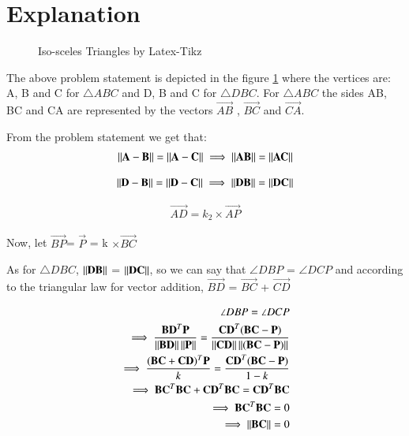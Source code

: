 \documentclass[journal,12pt,twocolumn]{IEEEtran}
\begin{document}
\section{Explanation}
\begin{figure}[!ht]
\centering
\resizebox{\columnwidth}{!}{}
\caption{Iso-sceles Triangles by Latex-Tikz}
\label{fig:iso_scelen}	
\end{figure}

The above problem statement is depicted in the figure \ref{fig:iso_scelen} where the vertices are: A, B and C for $\triangle ABC$ and D, B and C for $\triangle DBC$. For $\triangle ABC$ the sides AB, BC and CA are represented by the vectors $\vec{AB}$ , $\vec{BC}$ and $\vec{CA}$.

From the problem statement we get that:
\begin{align}
\left\lVert\mathbf{A}-\mathbf{B}\right\rVert = \left\lVert\mathbf{A}-\mathbf{C}\right\rVert
\implies \left\lVert\mathbf{AB}\right\rVert = \left\lVert\mathbf{AC}\right\rVert
\end{align}
\label{cond1}

\begin{align}
\left\lVert\mathbf{D}-\mathbf{B}\right\rVert = \left\lVert\mathbf{D}-\mathbf{C}\right\rVert
\implies \left\lVert\mathbf{DB}\right\rVert = \left\lVert\mathbf{DC}\right\rVert
\end{align}
\label{cond2}

\begin{align}
\vec{AD} = k_2 \times \vec{AP}
\end{align}

Now, let $\vec{BP}$= $\vec{P}$ = k $\times \vec{BC}$

As for $\triangle DBC$, $\left\lVert\mathbf{DB}\right\rVert$ = $\left\lVert\mathbf{DC}\right\rVert$, so we can say that $\angle DBP$ = $\angle DCP$ and according to the triangular law for vector addition, $\vec{BD}$ = $\vec{BC}$ + $\vec{CD}$

\begin{align}
\angle DBP = \angle DCP\\
\implies \frac{\mathbf{BD}^T \mathbf{P}}{\left\lVert\mathbf{BD}\right\rVert\left\lVert\mathbf{P}\right\rVert}=\frac{\mathbf{CD}^T (\mathbf{BC} - \mathbf{P})}{\left\lVert\mathbf{CD}\right\rVert\left\lVert(\mathbf{BC} - \mathbf{P})\right\rVert}\\
\implies \frac{(\mathbf{BC} + \mathbf{CD})^T \mathbf{P}}{k}=\frac{\mathbf{CD}^T (\mathbf{BC} - \mathbf{P})}{1-k}\\
\implies \mathbf{BC}^T \mathbf{BC} + \mathbf{CD}^T \mathbf{BC} = \mathbf{CD}^T \mathbf{BC}\\
\implies \mathbf{BC}^T \mathbf{BC} = 0\\
\implies \left\lVert\mathbf{BC}\right\rVert = 0
\end{align}
\end{document}
